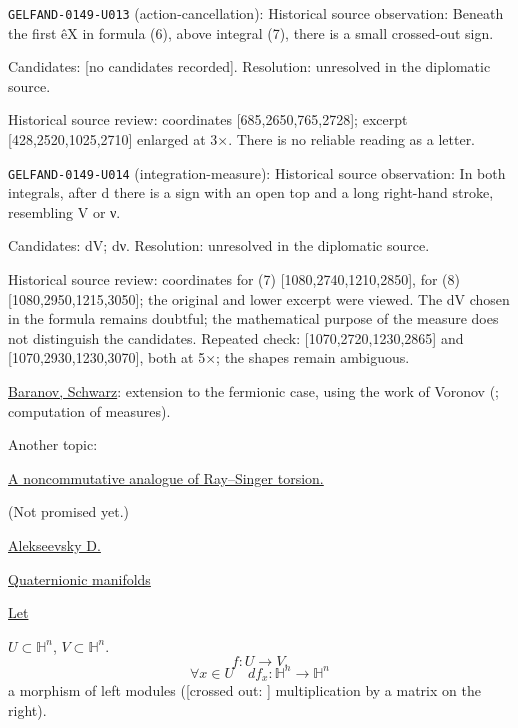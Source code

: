 \noindent\texttt{GELFAND-0149-U013} (action-cancellation): Historical source observation: Beneath the first êX in formula (6), above integral (7), there is a small crossed-out sign.\par
Candidates: [no candidates recorded]. Resolution: unresolved in the diplomatic source.\par
Historical source review: coordinates [685,2650,765,2728]; excerpt [428,2520,1025,2710] enlarged at 3×. There is no reliable reading as a letter.\par

\noindent\texttt{GELFAND-0149-U014} (integration-measure): Historical source observation: In both integrals, after d there is a sign with an open top and a long right-hand stroke, resembling V or ν.\par
Candidates: dV; dν. Resolution: unresolved in the diplomatic source.\par
Historical source review: coordinates for (7) [1080,2740,1210,2850], for (8) [1080,2950,1215,3050]; the original and lower excerpt were viewed. The dV chosen in the formula remains doubtful; the mathematical purpose of the measure does not distinguish the candidates. Repeated check: [1070,2720,1230,2865] and [1070,2930,1230,3070], both at 5×; the shapes remain ambiguous.\par



\underline{Baranov, Schwarz}: extension to the fermionic case, using
the work of  Voronov
(; computation of measures).

Another topic:

\underline{A noncommutative analogue of Ray--Singer torsion.}

(Not promised yet.)

\underline{Alekseevsky D.}

\underline{Quaternionic manifolds}

\underline{Let}
\quad $U\subset\mathbb H^n$, $V\subset\mathbb H^n$.
\begin{equation*}
f:U\to V.
\end{equation*}
\begin{equation*}
\forall x\in U\quad df_x:\mathbb H^n\to\mathbb H^n
\tag{1}
\end{equation*}
a morphism of left modules
([crossed out: ]
multiplication by a matrix on the right).

